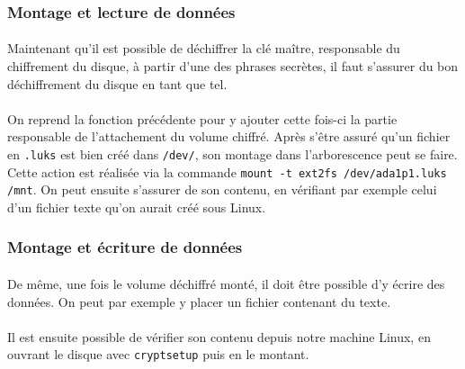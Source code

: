 \subsubsection{Montage et lecture de données}
\paragraph{}
Maintenant qu'il est possible de déchiffrer la clé maître, responsable du
chiffrement du disque, à partir d'une des phrases secrètes, il faut s'assurer du
bon déchiffrement du disque en tant que tel.
\paragraph{}
On reprend la fonction précédente pour y ajouter cette fois-ci la partie
responsable de l'attachement du volume chiffré. Après s'être assuré qu'un
fichier en \texttt{.luks} est bien créé dans \texttt{/dev/}, son montage dans
l'arborescence peut se faire. Cette action est réalisée via la commande
\texttt{mount -t ext2fs /dev/ada1p1.luks /mnt}. On peut ensuite s'assurer de son
contenu, en vérifiant par exemple celui d'un fichier texte qu'on aurait créé
sous Linux.

\subsubsection{Montage et écriture de données}
\paragraph{}
De même, une fois le volume déchiffré monté, il doit être possible d'y écrire
des données. On peut par exemple y placer un fichier contenant du texte.
\paragraph{}
Il est ensuite possible de vérifier son contenu depuis notre machine Linux, en
ouvrant le disque avec \texttt{cryptsetup} puis en le montant.